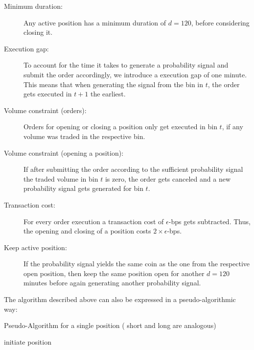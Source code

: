\begin{description}
    \item[Minimum duration:] {
        Any active position has a minimum duration of $ d = 120 $, before considering closing it.
    }
    \item[Execution gap:] {
        To account for the time it takes to generate a probability signal and submit the order accordingly,
        we introduce a execution gap of one minute. This means that when generating the signal from the bin in $ t $,
        the order gets executed in $ t + 1 $ the earliest.
    }
    \item[Volume constraint (orders):] { 
        Orders for opening or closing a position only get executed in bin $ t $, 
        if any volume was traded in the respective bin.
    }
    \item[Volume constraint (opening a position):] {
        If after submitting the order according to the sufficient probability signal the traded volume in bin $ t $
        is zero, the order gets canceled and a new probability signal gets generated for bin $ t $.
    }
    \item[Transaction cost:] {
        For every order execution a transaction cost of $ \epsilon $-bps gets subtracted. 
        Thus, the opening and closing of a position costs $ 2 \times \epsilon $-bps.
    }
    \item[Keep active position:] {
        If the probability signal yields the same coin as the one from the respective open position,
        then keep the same position open for another $ d=120 $ minutes before again generating another
        probability signal.
    }
\end{description}


The algorithm described above can also be expressed in a pseudo-algorithmic way:

\begin{algorithm}[H]
    \caption{Pseudo-Algorithm for a single position ( short and long are analogous) }
    initiate position\;

    
   \end{algorithm}
   